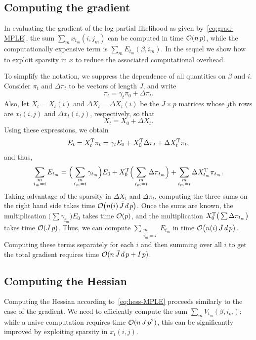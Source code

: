 \documentclass[final]{statsoc}
\begin{document}
\subsection{Computing the gradient}

In evaluating the gradient of the log partial likelihood as given by~\eqref{eq:grad-MPLE}, the sum $\sum_m x_{t_m}(i, j_m)$ can be computed in time $\mathcal{O}(n \, p)$, while the computationally
expensive term is
\(
   \sum_{m} E_{t_m}(\beta, i_m).
\)
In the sequel we show how to exploit sparsity in $x$ to reduce the associated computational overhead.

To simplify the notation, we suppress the dependence of all quantities on $\beta$ and $i$.
Consider $\pi_t$ and $\Delta \pi_t$ to be vectors of length $J$, and write
\[
    \pi_t = \gamma_t \pi_0 + \Delta \pi_t.
\]
Also, let $X_t = X_t(i)$ and $\Delta X_t = \Delta X_t(i)$ be the $J \times p$ matrices
whose $j$th rows are $x_t(i,j)$ and $\Delta x_t(i,j)$, respectively, so
that
\[
  X_t = X_0 + \Delta X_t.
\]
Using these expressions, we obtain
\[
  E_t = X_t^{\mathrm{T}} \pi_t
      = \gamma_t E_0
      + X_0^{\mathrm{T}} \Delta \pi_t
      + \Delta X_t^{\mathrm{T}} \pi_t,
\]
and thus,
\[
  \sum_{\substack{m  \\ i_m = i}} E_{t_m} =
    \Big(\sum_{\substack{ m \\ i_m = i}} \gamma_{t_m}\Big) E_0
    +
    X_0^{\mathrm{T}} \Big(\sum_{\substack{ m \\ i_m = i }} \Delta \pi_{t_m}\Big)
    +
    \sum_{\substack{m \\ i_m = i}} \Delta X_{t_m}^{\mathrm{T}} \pi_{t_m}.
\]
Taking advantage of the sparsity in $\Delta X_t$ and $\Delta \pi_t$, computing
the three sums on the right hand side takes time $\mathcal{O}\big(n(i) \,
\bar J \, d \, p\big)$.  Once the sums are known, the multiplication
$\Big(\sum \gamma_{t_m}\Big) E_0$ takes time $\mathcal{O}(p)$, and the
multiplication $X_0^{\mathrm{T}} \big( \sum \Delta \pi_{t_m}\big)$ takes time
$\mathcal{O}(\bar J \, p)$.  Thus, we can compute $\sum_{\substack{m \\ i_m = i}} E_{t_m}$ in time
$\mathcal{O}\big(n(i) \, \bar J \, d \, p\big)$.  Computing these terms separately for
each $i$ and then summing over all $i$ to get the total gradient requires time $\mathcal{O}(n
\, \bar J \, d \, p + I \, p)$.


\subsection{Computing the Hessian}

Computing the Hessian according to~\eqref{eq:hess-MPLE} proceeds similarly to the case of the
gradient.  We need to efficiently compute the sum $\sum_m V_{t_m}(\beta,
i_m)$; while a naive computation requires time $\mathcal{O}(n \, J \, p^2)$, this can be significantly improved by exploiting sparsity in $x_t(i,j)$.
\end{document}
